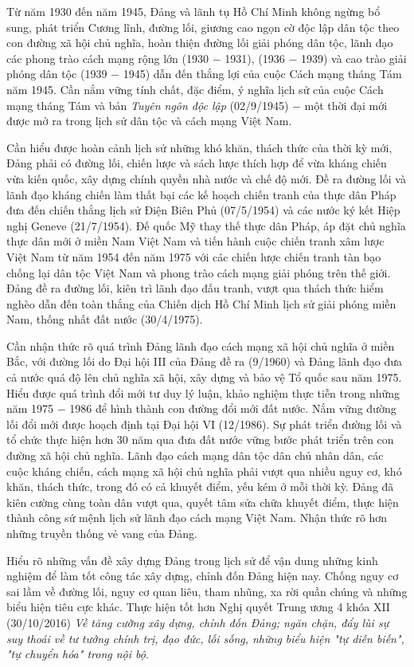 Từ năm 1930 đến năm 1945, Đảng và lãnh tụ Hồ Chí Minh không ngừng bổ sung, phát triển Cương lĩnh, đường lối, giương cao ngọn cờ độc lập dân tộc theo con đường xã hội chủ nghĩa, hoàn thiện đường lối giải phóng dân tộc, lãnh đạo các phong trào cách mạng rộng lớn (1930 $-$ 1931), (1936 $-$ 1939) và cao trào giải phóng dân tộc (1939 $-$ 1945) dẫn đến thắng lợi của cuộc Cách mạng tháng Tám năm 1945. Cần nắm vững tính chất, đặc điểm, ý nghĩa lịch sử của cuộc Cách mạng tháng Tám và bản \textit{Tuyên ngôn độc lập} (02/9/1945) $-$ một thời đại mới được mở ra trong lịch sử dân tộc và cách mạng Việt Nam.

Cần hiểu được hoàn cảnh lịch sử những khó khăn, thách thức của thời kỳ mới, Đảng phải có đường lối, chiến lược và sách lược thích hợp để vừa kháng chiến vừa kiến quốc, xây dựng chính quyền nhà nước và chế độ mới. Đề ra đường lối và lãnh đạo kháng chiến làm thất bại các kế hoạch chiến tranh của thực dân Pháp đưa đến chiến thắng lịch sử Điện Biên Phủ (07/5/1954) và các nước ký kết Hiệp nghị Geneve (21/7/1954). Đế quốc Mỹ thay thế thực dân Pháp, áp đặt chủ nghĩa thực dân mới ở miền Nam Việt Nam và tiến hành cuộc chiến tranh xâm lược Việt Nam từ năm 1954 đến năm 1975 với các chiến lược chiến tranh tàn bạo chống lại dân tộc Việt Nam và phong trào cách mạng giải phóng trên thế giới. Đảng đề ra đường lối, kiên trì lãnh đạo đấu tranh, vượt qua thách thức hiểm nghèo dẫn đến toàn thắng của Chiến dịch Hồ Chí Minh lịch sử giải phóng miền Nam, thống nhất đất nước (30/4/1975).

Cần nhận thức rõ quá trình Đảng lãnh đạo cách mạng xã hội chủ nghĩa ở miền Bắc, với đường lối do Đại hội III của Đảng đề ra (9/1960) và Đảng lãnh đạo đưa cả nước quá độ lên chủ nghĩa xã hội, xây dựng và bảo vệ Tổ quốc sau năm 1975. Hiểu được quá trình đổi mới tư duy lý luận, khảo nghiệm thực tiễn trong những năm 1975 $-$ 1986 để hình thành con đường đổi mới đất nước. Nắm vững đường lối đổi mới được hoạch định tại Đại hội VI (12/1986). Sự phát triển đường lối và tổ chức thực hiện hơn 30 năm qua đưa đất nước vững bước phát triển trên con đường xã hội chủ nghĩa. Lãnh đạo cách mạng dân tộc dân chủ nhân dân, các cuộc kháng chiến, cách mạng xã hội chủ nghĩa phải vượt qua nhiều nguy cơ, khó khăn, thách thức, trong đó có cả khuyết điểm, yếu kém ở mỗi thời kỳ. Đảng đã kiên cường cùng toàn dân vượt qua, quyết tâm sửa chữa khuyết điểm, thực hiện thành công sứ mệnh lịch sử lãnh đạo cách mạng Việt Nam. Nhận thức rõ hơn những truyền thống vẻ vang của Đảng.

Hiểu rõ những vấn đề xây dựng Đảng trong lịch sử để vận dung những kinh nghiệm để làm tốt công tác xây dựng, chỉnh đốn Đảng hiện nay. Chống nguy cơ sai lầm về đường lối, nguy cơ quan liêu, tham nhũng, xa rời quần chúng và những biểu hiện tiêu cực khác. Thực hiện tốt hơn Nghị quyết Trung ương 4 khóa XII (30/10/2016) \textit{Về tăng cường xây dựng, chỉnh đốn Đảng; ngăn chặn, đẩy lùi sự suy thoái về tư tưởng chính trị, đạo đức, lối sống, những biểu hiện "tự diễn biến", "tự chuyển hóa" trong nội bộ}.

